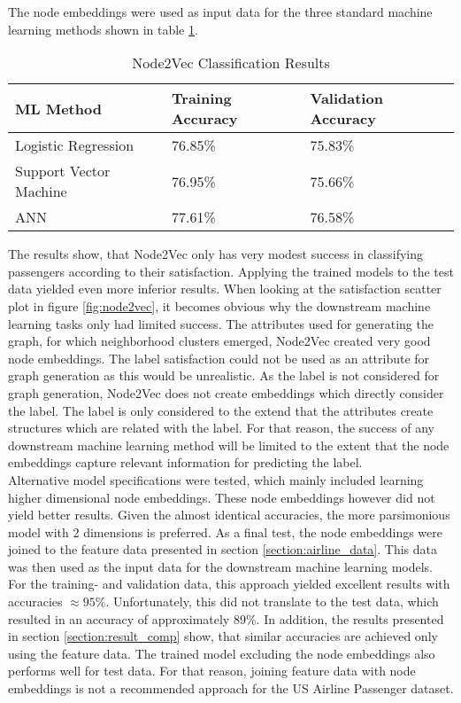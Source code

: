   \noindent The node embeddings were used as input data for the three standard 
  machine learning methods shown in table \ref{table:node2vec_results}.

  \begin{table}[h]
    \centering
    \begin{tabular}{|l||l|l|}
      \hline
      \textbf{ML Method} & \textbf{Training Accuracy} & \textbf{Validation
      Accuracy}\\
      \hline\hline
      Logistic Regression & 76.85\% & 75.83\% \\\hline 
      Support Vector Machine & 76.95\% & 75.66\% \\\hline
      ANN & 77.61\% & 76.58\% \\
      \hline
    \end{tabular}
    \caption{Node2Vec Classification Results}
    \label{table:node2vec_results}
  \end{table}

  \noindent The results show, that Node2Vec only has very modest success in
  classifying passengers according to their satisfaction. Applying the trained
  models to the test data yielded even more inferior results. When looking at the
  satisfaction scatter plot in figure \ref{fig:node2vec}, it becomes obvious why
  the downstream machine learning tasks only had limited success. The
  attributes used for generating the graph, for which neighborhood
  clusters emerged, Node2Vec created very good node embeddings. The label 
  satisfaction could not be used as an attribute for graph generation as this 
  would be unrealistic. As the label is not considered for graph generation,
  Node2Vec does not create embeddings which directly consider the label. The 
  label is only considered to the extend that the attributes create structures 
  which are related with the label. For that reason, the success of any 
  downstream machine learning method will be limited to the extent that the node 
  embeddings capture relevant information for predicting the label. \\

  \noindent Alternative model specifications were tested, which mainly included
  learning higher dimensional node embeddings. These node embeddings however
  did not yield better results. Given the almost identical accuracies, the more
  parsimonious model with 2 dimensions is preferred. As a final test, the node
  embeddings were joined to the feature data presented in section 
  \ref{section:airline_data}. This data was then used as the input data for the
  downstream machine learning models. For the training- and validation data,
  this approach yielded excellent results with accuracies $\approx 95\%$. 
  Unfortunately, this did not translate to the test data, which resulted in an 
  accuracy of approximately 89\%. In addition, the results presented in section
  \ref{section:result_comp} show, that similar accuracies are achieved
  only using the feature data. The trained model excluding the node embeddings
  also performs well for test data. For that reason, joining feature data with 
  node embeddings is not a recommended approach for the US Airline Passenger
  dataset.

